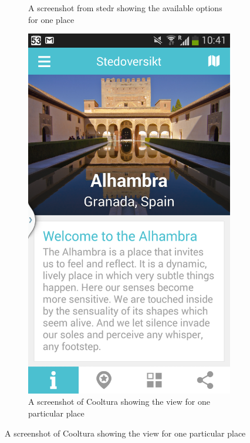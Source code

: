 \begin{figure}[h]
\begin{subfigure}[t]{0.3\textwidth}
		\caption{A screenshot from stedr showing the available options for one place}
		\label{Fig:stedr_screenshot}
	\end{subfigure}
	\hspace{0.5cm}
	\begin{subfigure}[t]{0.3\textwidth}
		\includegraphics[width=\textwidth]{fig/cooltura_screenshot2}
		\caption{A screenshot of Cooltura showing the view for one particular place}
		\label{Fig:cooltura_screenshot2}	
	\end{subfigure}	

\end{figure}
